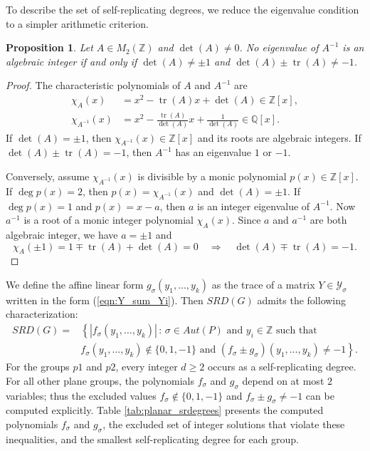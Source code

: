 \documentclass[draft]{adm-paper}
\DeclareMathOperator{\tr}{tr}
\newtheorem{proposition}[theorem]{Proposition}
\theoremstyle{definition}
\begin{document}
To describe the set of self-replicating degrees, we reduce the eigenvalue condition to a simpler arithmetic criterion.

\begin{proposition}\label{propos:planar-srdegrees}
  Let $A\in M_2(\mathbb{Z})$ and $\det(A)\neq 0$. No eigenvalue of $A^{-1}$ is an algebraic integer if and only if
   $\det(A)\neq \pm 1$ and $\det(A) \pm \operatorname{tr}(A) \neq -1$.
\end{proposition}

\begin{proof}
  The characteristic polynomials of $A$ and $A^{-1}$ are
  \begin{align*}
  \chi_A(x)&=x^2-\tr(A) x + \det(A)\in\mathbb{Z}[x],\\
  \chi_{A^{-1}}(x)&=x^2-\frac{\tr(A)}{\det(A)} x + \frac{1}{\det(A)}\in\mathbb{Q}[x].
  \end{align*}
  If $\det(A)=\pm 1$, then $\chi_{A^{-1}}(x)\in\mathbb{Z}[x]$ and its roots are algebraic integers. If $\det(A) \pm \tr(A) = -1$, then $A^{-1}$ has an eigenvalue $1$ or $-1$.

  Conversely, assume $\chi_{A^{-1}}(x)$ is divisible by a monic polynomial $p(x)\in\mathbb{Z}[x]$. If $\deg p(x)=2$,
  then $p(x)=\chi_{A^{-1}}(x)$ and $\det(A)=\pm 1$. If $\deg p(x)=1$ and $p(x)=x-a$, then $a$ is an integer eigenvalue
  of $A^{-1}$. Now $a^{-1}$ is a root of a monic integer polynomial $\chi_A(x)$. Since $a$ and $a^{-1}$ are both
  algebraic integer, we have $a=\pm 1$ and
  \[
  \chi_{A}(\pm 1)=1\mp \tr(A)+\det(A)=0 \quad \Rightarrow  \quad \det(A)\mp \tr(A)=-1.
  \]
\end{proof}

We define the affine linear form $g_\sigma(y_1,\ldots,y_k)$ as the trace of a matrix $Y\in \mathcal{Y}_\sigma$ written
in the form (\ref{eqn:Y_sum_Yi}). Then $SRD(G)$ admits the following characterization:
\begin{align*}
  SRD(G) =  & \left\{ | f_\sigma(y_1,\ldots, y_k)| \, : \, \sigma\in Aut(P) \text{ and } y_i\in\mathbb{Z} \text{ such that } \right. \\
    & \left. f_\sigma(y_1,\ldots, y_k)\notin\{0, 1, -1\} \text{ and } ( f_\sigma \pm g_\sigma)(y_1,\ldots,y_k)\neq -1 \right\}.
\end{align*}
For the groups $p1$ and $p2$, every integer $d\geq 2$ occurs as a self-replicating degree.
For all other plane groups, the polynomials $f_\sigma$ and $g_\sigma$ depend on at most $2$ variables; thus the excluded
values $f_\sigma\not\in \{0,1,-1\}$ and $f_\sigma \pm g_\sigma \neq -1$ can be computed explicitly.
Table \ref{tab:planar_srdegrees} presents the computed polynomials
$f_\sigma$ and $g_\sigma$, the excluded set of integer solutions that violate these inequalities, and the smallest self-replicating degree for each group.
\end{document}
